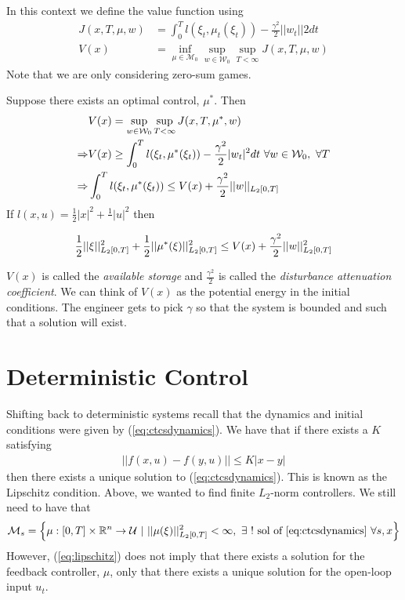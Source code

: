 In this context we define the value function using
\begin{align*}
J(x,T,\mu,w) &= \int_0^T l(\xi_t,\mu_t(\xi_t)) - \frac{\gamma^2}{2}||w_t||2dt \\
V(x) &= \inf_{\mu\in\mathcal{M}_0}\sup_{w\in\mathcal{W}_0}\sup_{T<\infty} J(x,T,\mu,w)
\end{align*}
Note that we are only considering zero-sum games.

Suppose there exists an optimal control, $\mu^\ast$.
Then
\begin{align*}
&V(x) = \sup_{w\in\mathcal{W}_0}\sup_{T<\infty}J(x,T,\mu^\ast,w) \\
\Rightarrow &V(x) \geq \int_0^T l(\xi_t,\mu^\ast(\xi_t)) - \frac{\gamma^2}{2}|w_t|^2dt~\forall w\in\mathcal{W}_0,~\forall T \\
\Rightarrow &\int_0^T l(\xi_t,\mu^\ast(\xi_t)) \leq V(x) + \frac{\gamma^2}{2}||w||_{L_2[0,T]}
\end{align*}
If $l(x,u)  = \frac{1}{2}|x|^2+\frac{1}{}|u|^2$ then

\begin{equation*}
\frac{1}{2}||\xi||^2_{L_2[0,T]} + \frac{1}{2}||\mu^\ast(\xi)||_{L_2[0,T]}^2 \leq V(x) + \frac{\gamma^2}{2}||w||^2_{L_2[0,T]}
\end{equation*}

$V(x)$ is called the \textit{available storage} and $\frac{\gamma^2}{2}$ is called the \textit{disturbance attenuation coefficient}.
We can think of $V(x)$ as the potential energy in the initial conditions.
The engineer gets to pick $\gamma$ so that the system is bounded and such that a solution will exist.

\section{Deterministic Control}
Shifting back to deterministic systems recall that the dynamics and initial conditions were given by (\ref{eq:ctcsdynamics}).
We have that if there exists a $K$ satisfying
\begin{align}
\label{eq:lipschitz}
||f(x,u)-f(y,u)||\leq K|x-y|
\end{align}
then there exists a unique solution to (\ref{eq:ctcsdynamics}).
This is known as the Lipschitz condition.
Above, we wanted to find finite $L_2$-norm controllers.
We still need to have that
\begin{align}
\label{eq:controlspace}
\mathcal{M}_s = \left\lbrace \mu:[0,T]\times\mathbb{R}^n\to\mathcal{U}~|~||\mu(\xi)||^2_{L_2[0,T]}<\infty,~\exists~! \text{~sol~of~\ref{eq:ctcsdynamics} } \forall s,x \right\rbrace
\end{align}
However, (\ref{eq:lipschitz}) does not imply that there exists a solution for the feedback controller, $\mu$, only that there exists a unique solution for the open-loop input $u_t$.

